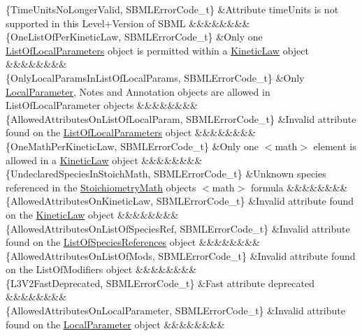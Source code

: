 \begin{DoxyParagraph}{}
\begin{longtabu}
\{Time\+Units\+No\+Longer\+Valid, S\+B\+M\+L\+Error\+Code\+\_\+t\} &Attribute \textquotesingle{}time\+Units\textquotesingle{} is not supported in this Level+\+Version of S\+B\+ML &&&&&&&&\\
\{One\+List\+Of\+Per\+Kinetic\+Law, S\+B\+M\+L\+Error\+Code\+\_\+t\} &Only one \hyperlink{class_list_of_local_parameters}{List\+Of\+Local\+Parameters} object is permitted within a \hyperlink{class_kinetic_law}{Kinetic\+Law} object &&&&&&&&\\
\{Only\+Local\+Params\+In\+List\+Of\+Local\+Params, S\+B\+M\+L\+Error\+Code\+\_\+t\} &Only \hyperlink{class_local_parameter}{Local\+Parameter}, Notes and Annotation objects are allowed in List\+Of\+Local\+Parameter objects &&&&&&&&\\
\{Allowed\+Attributes\+On\+List\+Of\+Local\+Param, S\+B\+M\+L\+Error\+Code\+\_\+t\} &Invalid attribute found on the \hyperlink{class_list_of_local_parameters}{List\+Of\+Local\+Parameters} object &&&&&&&&\\
\{One\+Math\+Per\+Kinetic\+Law, S\+B\+M\+L\+Error\+Code\+\_\+t\} &Only one {\ttfamily $<$math$>$} element is allowed in a \hyperlink{class_kinetic_law}{Kinetic\+Law} object &&&&&&&&\\
\{Undeclared\+Species\+In\+Stoich\+Math, S\+B\+M\+L\+Error\+Code\+\_\+t\} &Unknown species referenced in the \hyperlink{class_stoichiometry_math}{Stoichiometry\+Math} object\textquotesingle{}s {\ttfamily $<$math$>$} formula &&&&&&&&\\
\{Allowed\+Attributes\+On\+Kinetic\+Law, S\+B\+M\+L\+Error\+Code\+\_\+t\} &Invalid attribute found on the \hyperlink{class_kinetic_law}{Kinetic\+Law} object &&&&&&&&\\
\{Allowed\+Attributes\+On\+List\+Of\+Species\+Ref, S\+B\+M\+L\+Error\+Code\+\_\+t\} &Invalid attribute found on the \hyperlink{class_list_of_species_references}{List\+Of\+Species\+References} object &&&&&&&&\\
\{Allowed\+Attributes\+On\+List\+Of\+Mods, S\+B\+M\+L\+Error\+Code\+\_\+t\} &Invalid attribute found on the List\+Of\+Modifiers object &&&&&&&&\\
\{L3\+V2\+Fast\+Deprecated, S\+B\+M\+L\+Error\+Code\+\_\+t\} &Fast attribute deprecated &&&&&&&&\\
\{Allowed\+Attributes\+On\+Local\+Parameter, S\+B\+M\+L\+Error\+Code\+\_\+t\} &Invalid attribute found on the \hyperlink{class_local_parameter}{Local\+Parameter} object &&&&&&&&\\

\end{longtabu}
\end{DoxyParagraph}
